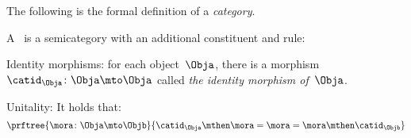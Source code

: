 The following is the formal definition of a \emph{category}.

%
%

\begin{ctdefinition}[Category]
  \label{def:categorymain}
  A \emph{}~\CatC is a semicategory with an additional constituent and rule:
\begin{body}
    \constit
  \begin{compactenum}
    \item Identity morphisms: for each object~$\Obja$, there is
    a morphism~$\catid_{\Obja}\colon \Obja \mto \Obja$  called \emph{the identity
    morphism of~$\Obja$}.
  \end{compactenum}
 \condit
  \begin{compactenum}
    \item Unitality: It holds that:
    \begin{equation}
        \prftree{\mora \colon \Obja \mto \Objb}{\catid_\Obja \mthen \mora= \mora = \mora \mthen \catid_\Objb}
      \end{equation}
  \end{compactenum}
  \end{body}
\end{ctdefinition}


